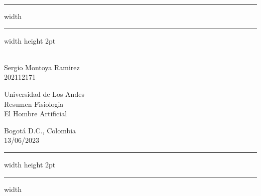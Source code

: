 \newenvironment{notes}
  {\begin{list}
     {{\fbseries Note \arabic{counter}.}}
    {\usecounter{counter}
     \setlength{\labelsep}{1em}
     \setlength{\itemsep}{2pt}
     \setlength{\leftmargin}{2em}
     \setlength{\rightmargin}{0cm}
     \setlength{\itemindent}{1em} }}
{\end{list}}

\vspace*{-1cm}
\hrule width \hsize \kern 1mm \hrule width \hsize height 2pt
\begin{center}
   \parbox[c]{.32\textwidth}{
   \hspace{1cm}\\
   Sergio Montoya Ramirez\\
   202112171}
   \hspace*{\fill}
   \parbox[c]{.35\textwidth}{\centering
   Universidad de Los Andes\\
   Resumen Fisiologia\\
   El Hombre Artificial
   }
   \hspace*{\fill}
   \parbox[c]{.3\textwidth}{
   \begin{flushleft}
      Bogotá D.C., Colombia\\
      13/06/2023
   \end{flushleft}}
\end{center}
\hrule width \hsize height 2pt \kern 1mm \hrule width \hsize

\bigskip

